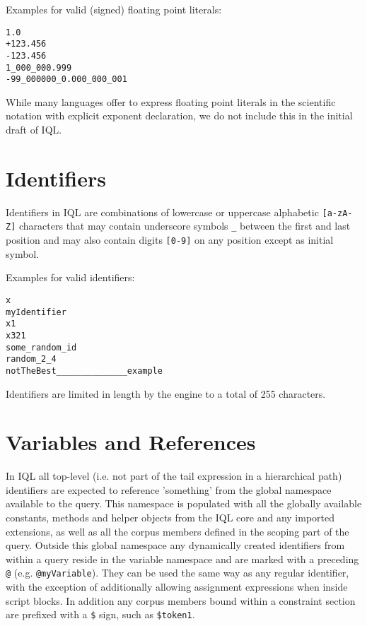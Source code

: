 \documentclass[11pt]{article}
\begin{document}
Examples for valid (signed) floating point literals:

\begin{verbatim}
1.0
+123.456
-123.456
1_000_000.999
-99_000000_0.000_000_001
\end{verbatim}

While many languages offer to express floating point literals in the scientific notation with explicit exponent declaration, we do not include this in the initial draft of IQL.

\section{Identifiers}
\label{sec:identifiers}

Identifiers in IQL are combinations of lowercase or uppercase alphabetic \texttt{[a-zA-Z]} characters that may contain underscore symbols \texttt{\_} between the first and last position and may also contain digits \texttt{[0-9]} on any position except as initial symbol.

Examples for valid identifiers:

\begin{verbatim}
x
myIdentifier
x1
x321
some_random_id
random_2_4
notTheBest______________example
\end{verbatim}

Identifiers are limited in length by the engine to a total of 255 characters. 

\section{Variables and References}
\label{sec:variables-references}

In IQL all top-level (i.e. not part of the tail expression in a hierarchical path) identifiers are expected to reference 'something' from the global namespace available to the query. This namespace is populated with all the globally available constants, methods and helper objects from the IQL core and any imported extensions, as well as all the corpus members defined in the scoping part of the query. Outside this global namespace any dynamically created identifiers from within a query reside in the variable namespace and are marked with a preceding \texttt{@} (e.g. \texttt{@myVariable}). They can be used the same way as any regular identifier, with the exception of additionally allowing assignment expressions when inside script blocks. In addition any corpus members bound within a constraint section are prefixed with a \texttt{\$} sign, such as \texttt{\$token1}.
\end{document}
